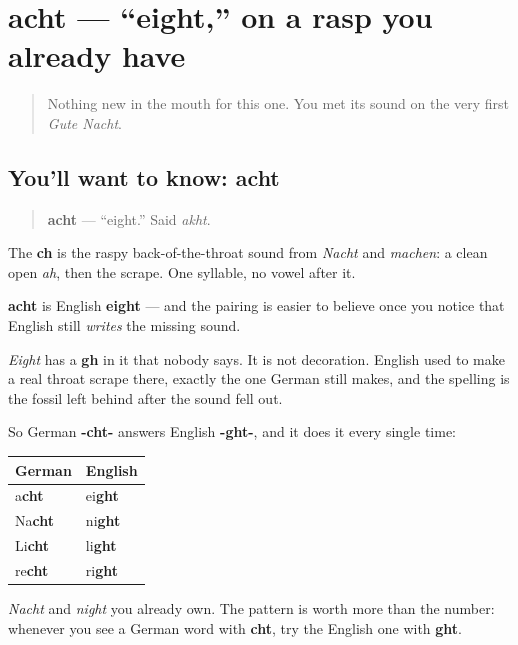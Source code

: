 \section[acht]{acht — \textquotedblleft{}eight,\textquotedblright{} on a rasp you already have}

\label{lesson:GE-C06-acht}



\begin{quote}
Nothing new in the mouth for this one. You met its sound on the very first \emph{Gute Nacht}.
\end{quote}

\subsection*{You'll want to know: acht}
\begin{quote}
\textbf{acht} — \textquotedblleft{}eight.\textquotedblright{} Said \emph{akht}.
\end{quote}

The \textbf{ch} is the raspy back-of-the-throat sound from \emph{Nacht} and \emph{machen}: a clean open \emph{ah}, then the scrape. One syllable, no vowel after it.

\begin{cousinweb}
\textbf{acht} is English \textbf{eight} — and the pairing is easier to believe once you notice that English still \emph{writes} the missing sound.

\emph{Eight} has a \textbf{gh} in it that nobody says. It is not decoration. English used to make a real throat scrape there, exactly the one German still makes, and the spelling is the fossil left behind after the sound fell out.

So German \textbf{-cht-} answers English \textbf{-ght-}, and it does it every single time:

\noindent
\begin{tabularx}{\linewidth}{@{}>{\raggedright\arraybackslash}X>{\raggedright\arraybackslash}X@{}}
\toprule
\textbf{German} & \textbf{English} \\
\midrule
a\textbf{cht} & ei\textbf{ght} \\
Na\textbf{cht} & ni\textbf{ght} \\
Li\textbf{cht} & li\textbf{ght} \\
re\textbf{cht} & ri\textbf{ght} \\
\bottomrule
\end{tabularx}

\emph{Nacht} and \emph{night} you already own. The pattern is worth more than the number: whenever you see a German word with \textbf{cht}, try the English one with \textbf{ght}.
\end{cousinweb}

